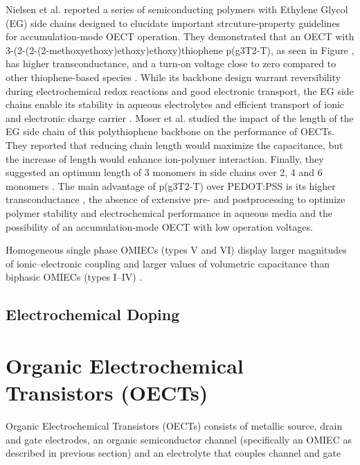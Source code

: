 Nielsen et al. reported a series of semiconducting polymers with Ethylene Glycol (EG) side chains designed to elucidate important strcuture-property guidelines for accumulation-mode OECT operation. They demonstrated that an OECT with 3-(2-(2-(2-methoxyethoxy)ethoxy)ethoxy)thiophene p(g3T2-T), as seen in Figure , has higher transconductance, and a turn-on voltage close to zero compared to other thiophene-based species \cite{nielsenMolecularDesignSemiconducting2016}. While its backbone design warrant reversibility during electrochemical redox reactions and good electronic transport, the EG side chains enable its stability in aqueous electrolytes and efficient transport of ionic and electronic charge carrier \cite{moiaDesignEvaluationConjugated2019}. Moser et al. studied the impact of the length of the EG side chain of this polythiophene backbone on the performance of OECTs. They reported that reducing chain length would maximize the capacitance, but the increase of length would enhance ion-polymer interaction. Finally, they suggested an optimum length of 3 monomers in side chains over 2, 4 and 6 monomers \cite{moserEthyleneGlycolBasedSide2020}. The main advantage of p(g3T2-T) over PEDOT:PSS is its higher transconductance \cite{nielsenMolecularDesignSemiconducting2016}, the absence of extensive pre- and postprocessing to optimize polymer stability and electrochemical performance in aqueous media and the possibility of an accumulation-mode OECT with low operation voltages\cite{moserEthyleneGlycolBasedSide2020}.

Homogeneous single phase OMIECs (types V and VI) display larger magnitudes of ionic–electronic coupling and larger values of volumetric capacitance than biphasic OMIECs (types I–IV) \cite{paulsenOrganicMixedIonic2020}. 



\subsection{Electrochemical Doping}


\section{Organic Electrochemical Transistors (OECTs)}

Organic Electrochemical Transistors (OECTs) consists of metallic source, drain and gate electrodes, an organic semiconductor channel (specifically an OMIEC as described in previous section) and an electrolyte that couples channel and gate \cite{rivnayOrganicElectrochemicalTransistors2018}

